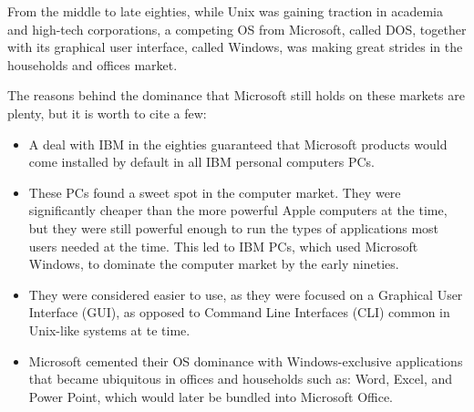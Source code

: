 \vspace{0.5cm}
\begin{my_box}
From the middle to late eighties, while Unix was gaining traction in academia and high-tech corporations, a competing \acs{OS} from Microsoft, called DOS, together with its graphical user interface, called Windows, was making great strides in the households and offices market.

The reasons behind the dominance that Microsoft still holds on these markets are plenty, but it is worth to cite a few:
\begin{itemize}
\item A deal with IBM in the eighties guaranteed that Microsoft products would come installed by default in all IBM personal computers \acs{PC}s.
\item These \acs{PC}s found a sweet spot in the computer market. They were significantly cheaper than the more powerful Apple computers at the time, but they were still powerful enough to run the types of applications most users needed at the time. This led to IBM \acs{PC}s, which used Microsoft Windows, to dominate the computer market by the early nineties.
\item They were considered easier to use, as they were focused on a Graphical User Interface (\acs{GUI}), as opposed to Command Line Interfaces (\acs{CLI}) common in Unix-like systems at te time.
\item Microsoft cemented their \acs{OS} dominance with Windows-exclusive applications that became ubiquitous in offices and households such as: Word, Excel, and Power Point, which would later be bundled into Microsoft Office.
\end{itemize}
\end{my_box}
